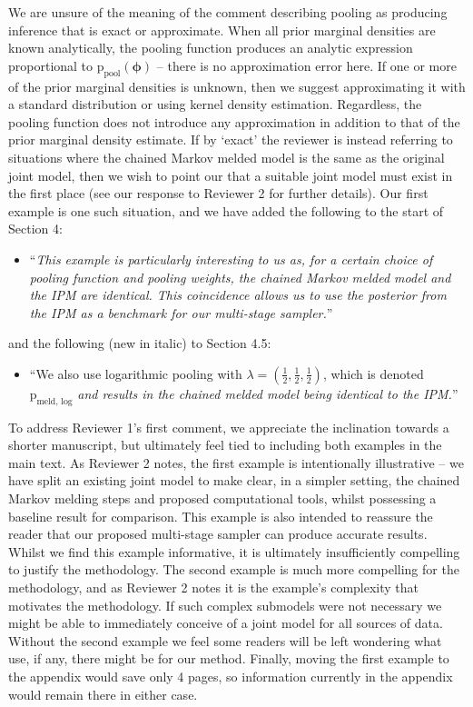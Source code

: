 \documentclass[
  10pt,
  a4paper,
]{article}
\providecommand{\tightlist}{%
  \setlength{\itemsep}{0pt}\setlength{\parskip}{0pt}}
\newcommand{\pd}{\text{p}}
\begin{document}
We are unsure of the meaning of the comment describing pooling as
producing inference that is exact or approximate. When all prior
marginal densities are known analytically, the pooling function produces
an analytic expression proportional to
\(\pd_{\text{pool}}(\boldsymbol{\phi})\) -- there is no approximation
error here. If one or more of the prior marginal densities is unknown,
then we suggest approximating it with a standard distribution or using
kernel density estimation. Regardless, the pooling function does not
introduce any approximation in addition to that of the prior marginal
density estimate. If by `exact' the reviewer is instead referring to
situations where the chained Markov melded model is the same as the
original joint model, then we wish to point our that a suitable joint
model must exist in the first place (see our response to Reviewer 2 for
further details). Our first example is one such situation, and we have
added the following to the start of Section 4:

\begin{itemize}
\tightlist
\item
  ``\emph{This example is particularly interesting to us as, for a
  certain choice of pooling function and pooling weights, the chained
  Markov melded model and the IPM are identical. This coincidence allows
  us to use the posterior from the IPM as a benchmark for our
  multi-stage sampler.}''
\end{itemize}

and the following (new in italic) to Section 4.5:

\begin{itemize}
\tightlist
\item
  ``We also use logarithmic pooling with
  \(\lambda = (\frac{1}{2}, \frac{1}{2}, \frac{1}{2})\), which is
  denoted \(\pd_{\text{meld, log}}\) \emph{and results in the chained
  melded model being identical to the IPM.}''
\end{itemize}

To address Reviewer 1's first comment, we appreciate the inclination
towards a shorter manuscript, but ultimately feel tied to including both
examples in the main text. As Reviewer 2 notes, the first example is
intentionally illustrative -- we have split an existing joint model to
make clear, in a simpler setting, the chained Markov melding steps and
proposed computational tools, whilst possessing a baseline result for
comparison. This example is also intended to reassure the reader that
our proposed multi-stage sampler can produce accurate results. Whilst we
find this example informative, it is ultimately insufficiently
compelling to justify the methodology. The second example is much more
compelling for the methodology, and as Reviewer 2 notes it is the
example's complexity that motivates the methodology. If such complex
submodels were not necessary we might be able to immediately conceive of
a joint model for all sources of data. Without the second example we
feel some readers will be left wondering what use, if any, there might
be for our method. Finally, moving the first example to the appendix
would save only 4 pages, so information currently in the appendix would
remain there in either case.
\end{document}
